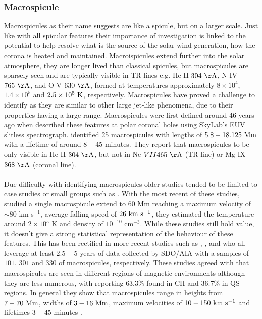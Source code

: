 \documentclass[12pt]{ociamthesis}
\newcommand{\kms}{~\rm{km ~s^{-1}}}
\newcommand{\np}{\\ \\}
\begin{document}
\subsubsection{Macrospicule}
\label{subsec:Mspic}
Macrospicules as their name suggests are like a spicule, but on a larger scale. Just like with all spicular features their importance of investigation is linked to the potential to help resolve what is the source of the solar wind generation, how the corona is heated and maintained. Macroispicules extend further into the solar atmosphere, they are longer lived than classical spicules, but macrospicules are sparsely seen and are typically visible in TR lines e.g. He II $304~\rm{\AA}$, N IV $765~\rm{\AA}$, and O V $630~\rm{\AA}$, formed at temperatures approximately $8\times10^4$, $1.4\times10^5$ and $2.5\times10^5~\rm{K}$, respectively. Macrospicules have proved a challenge to identify as they are similar to other large jet-like phenomena, due to their properties having a large range. Macrospicules were first defined around 46 years ago when \cite{Bohlin1975ApJ197L133B} described these features at polar coronal holes using SkyLab's EUV slitless spectrograph. \cite{Bohlin1975ApJ197L133B} identified 25 macrospicules with lengths of $5.8-18.125~\rm{Mm}$ with a lifetime of around $8-45$ minutes. They report that macrospicules to be only visible in He II $304~\rm{\AA}$, but not in Ne $VII 465~\rm{\AA}$ (TR line) or Mg IX $368~\rm{\AA}$ (coronal line). \np
%
Due difficulty with identifying macrospicules older studies tended to be limited to case studies or small groups such as \citep[][e.g.]{Moe1975SoPh4065K, Bohlin1975ApJ197L133B, Labonte1979SoPh61283L, Pike1997SoPh175457P, Pike1998SoPh182333P, Parenti2002AA384303P}. With the most recent of these studies, \cite{Parenti2002AA384303P} studied a single macrospicule extend to $60$ Mm reaching a maximum velocity of $\sim 80$ km s$^{-1}$, average falling speed of $26\kms$, they estimated the temperature around $2\times10^5$ K and density of $10^{-10}$ cm$^{-3}$. While these studies still hold value, it doesn't give a strong statistical representation of the behaviour of these features. This has been rectified in more recent studies such as \cite{Bennett2015ApJ808135B}, \cite{Kiss2017ApJ83547K}, and \cite{Loboda2019ApJ871230L} who all leverage at least $2.5-5$ years of data collected by SDO/AIA with a samples of $101$,
$301$ and $330$ of macrospicules, respectively. These studies agreed with \cite{Wang1998ApJ509461W} that macrospicules are seen in different regions of magnetic environments although they are less numerous, with \cite{Loboda2019ApJ871230L} reporting $63.3\%$ found in CH and $36.7\%$ in QS regions. In general they show that macrospicules range in heights from $7- 70~\rm{Mm}$, widths of $3-16~\rm{Mm}$, maximum velocities of $10-150\kms$ and  lifetimes $3-45$ minutes \citep{Bohlin1975ApJ197L133B, Withbroe1976ApJ, Karovska1994ApJ, Parenti2002AA384303P, Bennett2015ApJ808135B, Kiss2017ApJ83547K, Loboda2019ApJ871230L}. \np
\end{document}
